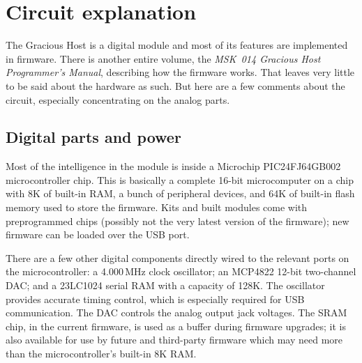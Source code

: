 
%
%
%
%
%
%

\chapter{Circuit explanation}

The Gracious Host is a digital module and most of its features are
implemented in firmware.  There is another entire volume, the \emph{MSK~014
Gracious Host Programmer's Manual}, describing how the firmware works.  That
leaves very little to be said about the hardware as such.  But here are a
few comments about the circuit, especially concentrating on the analog parts.

\section{Digital parts and power}

Most of the intelligence in the module is inside a Microchip PIC24FJ64GB002
microcontroller chip.  This is basically a complete 16-bit microcomputer on
a chip with 8K of built-in RAM, a bunch of peripheral devices, and 64K of
built-in flash memory used to store the firmware.  Kits and built modules
come with preprogrammed chips (possibly not the very latest version of the
firmware); new firmware can be loaded over the USB port.

There are a few other digital components directly wired to the relevant
ports on the microcontroller: a 4.000\,MHz clock oscillator; an MCP4822
12-bit two-channel DAC; and a 23LC1024 serial RAM with a capacity of 128K. 
The oscillator provides accurate timing control, which is especially
required for USB communication.  The DAC controls the analog output jack
voltages.  The SRAM chip, in the current firmware, is used as a buffer
during firmware upgrades; it is also available for use by future and
third-party firmware which may need more than the microcontroller's built-in
8K RAM.

